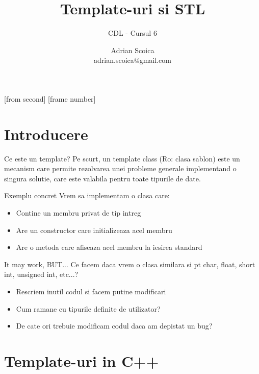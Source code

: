 \documentclass{beamer}
\title[Template-uri si STL]{Template-uri si STL}
\subtitle{CDL - Cursul 6}
\institute{ROSEdu}
\author{Adrian Scoica \\ {\footnotesize adrian.scoica@gmail.com}}
\begin{document}
[from second]
[frame number]

\frame{\titlepage}

\frame{\tableofcontents}


\section{Introducere}

  \frame{\tableofcontents[currentsection]}

  \begin{frame}{Ce este un template?}
  Pe scurt, un template class (Ro: clasa sablon) este un mecanism care permite rezolvarea unei probleme generale implementand o singura solutie, care este valabila pentru toate tipurile de date.
  \end{frame}
 
  \begin{frame}{Exemplu concret}
  Vrem sa implementam o clasa care:\\
  \vspace{0.2cm}
  \begin{itemize}
  \setlength{\itemsep}{0.2cm}
  \pause \item Contine un membru privat de tip intreg 
  \pause \item Are un constructor care initializeaza acel membru
  \pause \item Are o metoda care afiseaza acel membru la iesirea standard
  \end{itemize}
  \pause
  
  \end{frame}

  \begin{frame}{It may work, BUT...}
  Ce facem daca vrem o clasa similara si pt char, float, short int, unsigned int, etc...?
  \begin{itemize}
  \pause \item Rescriem inutil codul si facem putine modificari
  \pause \item Cum ramane cu tipurile definite de utilizator?
  \pause \item De cate ori trebuie modificam codul daca am depistat un bug?
  \end{itemize}
  \vspace{0.6cm}
  \pause
  \end{frame}

\section{Template-uri in C++}
\end{document}
